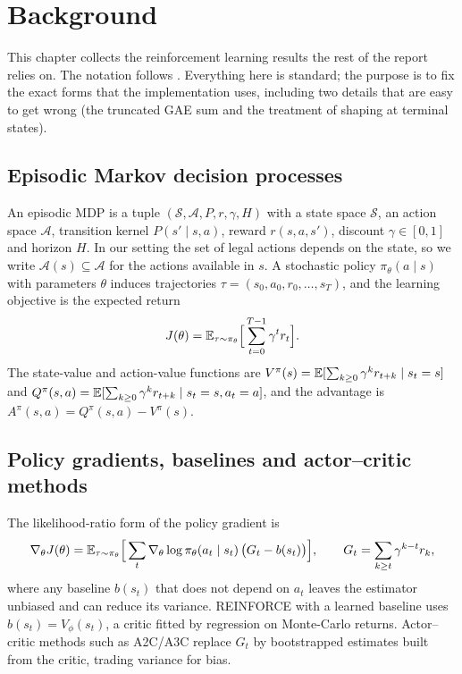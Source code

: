 \chapter{Background}
\label{ch:background}

This chapter collects the reinforcement learning results the rest of the report relies on. The notation follows \citet{sutton2018reinforcement}. Everything here is standard; the purpose is to fix the exact forms that the implementation uses, including two details that are easy to get wrong (the truncated GAE sum and the treatment of shaping at terminal states).

\section{Episodic Markov decision processes}

An episodic MDP is a tuple $(\mathcal{S},\mathcal{A},P,r,\gamma,H)$ with a state space $\mathcal{S}$, an action space $\mathcal{A}$, transition kernel $P(s'\mid s,a)$, reward $r(s,a,s')$, discount $\gamma\in[0,1]$ and horizon $H$. In our setting the set of legal actions depends on the state, so we write $\mathcal{A}(s)\subseteq\mathcal{A}$ for the actions available in $s$. A stochastic policy $\pi_\theta(a\mid s)$ with parameters $\theta$ induces trajectories $\tau=(s_0,a_0,r_0,\dots,s_T)$, and the learning objective is the expected return
\begin{equation}
  J(\theta)=\mathbb{E}_{\tau\sim\pi_\theta}\Big[\sum_{t=0}^{T-1}\gamma^t r_t\Big].
\end{equation}
The state-value and action-value functions are $V^\pi(s)=\mathbb{E}[\sum_{k\ge 0}\gamma^k r_{t+k}\mid s_t=s]$ and $Q^\pi(s,a)=\mathbb{E}[\sum_{k\ge0}\gamma^k r_{t+k}\mid s_t=s,a_t=a]$, and the advantage is $A^\pi(s,a)=Q^\pi(s,a)-V^\pi(s)$.

\section{Policy gradients, baselines and actor--critic methods}

The likelihood-ratio form of the policy gradient \citep{williams1992simple} is
\begin{equation}
  \nabla_\theta J(\theta)=\mathbb{E}_{\tau\sim\pi_\theta}\Big[\sum_{t}\nabla_\theta\log\pi_\theta(a_t\mid s_t)\,\big(G_t-b(s_t)\big)\Big],
  \qquad G_t=\sum_{k\ge t}\gamma^{k-t}r_k ,
  \label{eq:reinforce}
\end{equation}
where any baseline $b(s_t)$ that does not depend on $a_t$ leaves the estimator unbiased and can reduce its variance. REINFORCE with a learned baseline uses $b(s_t)=V_\phi(s_t)$, a critic fitted by regression on Monte-Carlo returns. Actor--critic methods such as A2C/A3C \citep{mnih2016asynchronous} replace $G_t$ by bootstrapped estimates built from the critic, trading variance for bias.

